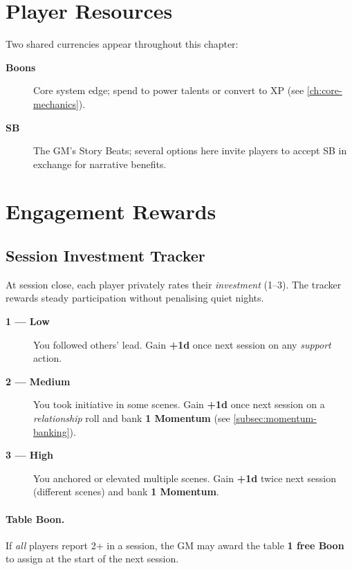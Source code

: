 \section{Player Resources}

Two shared currencies appear throughout this chapter:
\begin{description}
  \item[\textbf{Boons}] Core system edge; spend to power talents or convert to XP (see \ref{ch:core-mechanics}).
  \item[\textbf{SB}] The GM's Story Beats; several options here invite players to accept SB in exchange for narrative benefits.
\end{description}

\section{Engagement Rewards}

\subsection{Session Investment Tracker}
At session close, each player privately rates their \emph{investment} (1--3). The tracker rewards steady participation without penalising quiet nights.

\begin{description}
  \item[\textbf{1 --- Low}] You followed others' lead. Gain \textbf{+1d} once next session on any \emph{support} action.
  \item[\textbf{2 --- Medium}] You took initiative in some scenes. Gain \textbf{+1d} once next session on a \emph{relationship} roll and bank \textbf{1 Momentum} (see \ref{subsec:momentum-banking}).
  \item[\textbf{3 --- High}] You anchored or elevated multiple scenes. Gain \textbf{+1d} twice next session (different scenes) and bank \textbf{1 Momentum}.
\end{description}

\paragraph{Table Boon.}
If \emph{all} players report 2+ in a session, the GM may award the table \textbf{1 free Boon} to assign at the start of the next session.

